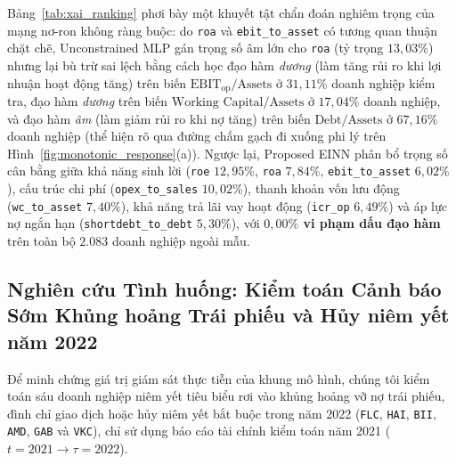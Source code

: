 \documentclass[11pt,a4paper]{article}
\begin{document}
Bảng~\ref{tab:xai_ranking} phơi bày một khuyết tật chẩn đoán nghiêm trọng của mạng nơ-ron không ràng buộc: do \texttt{roa} và \texttt{ebit\_to\_asset} có tương quan thuận chặt chẽ, Unconstrained MLP gán trọng số âm lớn cho \texttt{roa} (tỷ trọng $13,03\%$) nhưng lại bù trừ sai lệch bằng cách học đạo hàm \textit{dương} (làm tăng rủi ro khi lợi nhuận hoạt động tăng) trên biến $\text{EBIT}_{\text{op}}/\text{Assets}$ ở $31,11\%$ doanh nghiệp kiểm tra, đạo hàm \textit{dương} trên biến $\text{Working Capital}/\text{Assets}$ ở $17,04\%$ doanh nghiệp, và đạo hàm \textit{âm} (làm giảm rủi ro khi nợ tăng) trên biến $\text{Debt}/\text{Assets}$ ở $67,16\%$ doanh nghiệp (thể hiện rõ qua đường chấm gạch đi xuống phi lý trên Hình~\ref{fig:monotonic_response}(a)). Ngược lại, Proposed EINN phân bổ trọng số cân bằng giữa khả năng sinh lời (\texttt{roe} $12,95\%$, \texttt{roa} $7,84\%$, \texttt{ebit\_to\_asset} $6,02\%$), cấu trúc chi phí (\texttt{opex\_to\_sales} $10,02\%$), thanh khoản vốn lưu động (\texttt{wc\_to\_asset} $7,40\%$), khả năng trả lãi vay hoạt động (\texttt{icr\_op} $6,49\%$) và áp lực nợ ngắn hạn (\texttt{shortdebt\_to\_debt} $5,30\%$), với \textbf{$0,00\%$ vi phạm dấu đạo hàm} trên toàn bộ $2.083$ doanh nghiệp ngoài mẫu.

\subsection{Nghiên cứu Tình huống: Kiểm toán Cảnh báo Sớm Khủng hoảng Trái phiếu và Hủy niêm yết năm 2022}
Để minh chứng giá trị giám sát thực tiễn của khung mô hình, chúng tôi kiểm toán sáu doanh nghiệp niêm yết tiêu biểu rơi vào khủng hoảng vỡ nợ trái phiếu, đình chỉ giao dịch hoặc hủy niêm yết bắt buộc trong năm 2022 (\texttt{FLC}, \texttt{HAI}, \texttt{BII}, \texttt{AMD}, \texttt{GAB} và \texttt{VKC}), chỉ sử dụng báo cáo tài chính kiểm toán năm 2021 ($t=2021 \to \tau=2022$).
\end{document}
